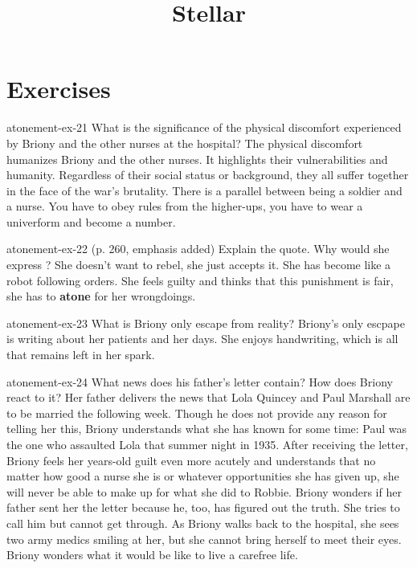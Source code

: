 \documentclass[preview]{standalone}
\begin{document}
\title{Stellar}
\genpage

\section{Exercises}

\begin{snippetexercise}{atonement-ex-21}
    {What is the significance of the physical discomfort experienced by Briony and the other nurses at
    the hospital?}
    The physical discomfort humanizes Briony and the other nurses.
    It highlights their vulnerabilities and humanity. Regardless of their social
    status or background, they all suffer together in the face of the war's brutality.
    There is a parallel between being a soldier and a nurse. You have to obey
    rules from the higher-ups, you have to wear a univerform and become a number.
\end{snippetexercise}

\begin{snippetexercise}{atonement-ex-22}
    { (p. 260, emphasis added) Explain the quote. Why would she express ?}
    She doesn't want to rebel, she just accepts it. She has become like a robot
    following orders.
    She feels guilty and thinks that this punishment is fair,
    she has to \textbf{atone} for her wrongdoings.
\end{snippetexercise}

\begin{snippetexercise}{atonement-ex-23}
    {What is Briony only escape from reality?}
    Briony's only escpape is writing about her patients and her days.
    She enjoys handwriting, which is all that remains left in her spark.
\end{snippetexercise}

\begin{snippetexercise}{atonement-ex-24}
    {What news does his father's letter contain? How does Briony react to it?}
    Her father delivers the news that Lola Quincey and Paul Marshall are to
    be married the following week.
    Though he does not provide any reason for telling her this,
    Briony understands what she has known for some time:
    Paul was the one who assaulted Lola that summer night in 1935.
    After receiving the letter, Briony feels her years-old guilt
    even more acutely and understands that no matter how good a nurse she is
    or whatever opportunities she has given up,
    she will never be able to make up for what she did to Robbie.
    Briony wonders if her father sent her the letter because he, too, has figured out the truth.
    She tries to call him but cannot get through.
    As Briony walks back to the hospital,
    she sees two army medics smiling at her, but she cannot bring herself to meet their eyes.
    Briony wonders what it would be like to live a carefree life.
\end{snippetexercise}
\end{document}
